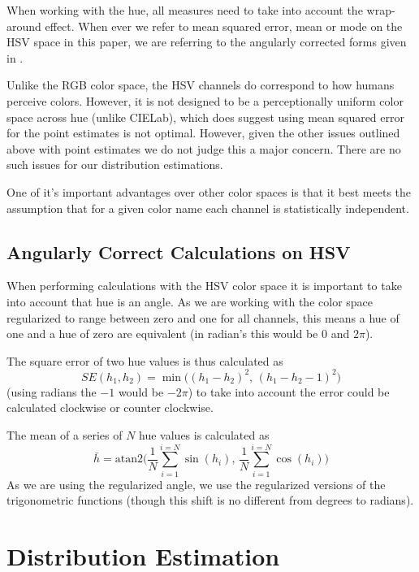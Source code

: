 \documentclass[11pt,a4paper]{article}
\begin{document}
When working with the hue, all measures need to take into account the wrap-around effect.
When ever we refer to mean squared error, mean or mode on the HSV space in this paper, we are referring to the angularly corrected forms given in .


Unlike the RGB color space, the HSV channels do correspond to how humans perceive colors.
However, it is not designed to be a perceptionally uniform color space across hue (unlike CIELab), which does suggest using mean squared error for the point estimates is not optimal.
However, given the other issues outlined above with point estimates we do not judge this a major concern.
There are no such issues for our distribution estimations.

One of it's important advantages over other color spaces is that it best meets the assumption that for a given color name each channel is statistically independent.

\subsection{Angularly Correct Calculations on HSV}\label{sec:angularly-correct}
When performing calculations with the HSV color space it is important to take into account that hue is an angle.
As we are working with the color space regularized to range between zero and one for all channels,
this means a hue of one and a hue of zero are equivalent (in radian's this would be $0$ and $2\pi$).

The square error of two hue values is thus calculated as
\begin{equation}
SE(h_1, h_2) = \min \big( \left(h_1 - h_2 \right)^2, \, \left(h_1 - h_2 -1 \right)^2  \big)
\end{equation}
(using radians the $-1$ would be $-2\pi$)
to take into account the error could be calculated clockwise or counter clockwise.


The mean of a series of  $N$ hue values is calculated as 
\begin{equation}
\bar h = \mathrm{atan2} \Bigg(%
	\frac{1}{N} \sum_{i=1}^{i=N} \sin (h_i), \,  %
	\frac{1}{N} \sum_{i=1}^{i=N} \cos (h_i)%
\Bigg)%
\end{equation}
As we are using the regularized angle, we use the regularized versions of the trigonometric functions (though this shift is no different from degrees to radians).




\section{Distribution Estimation}
\end{document}
